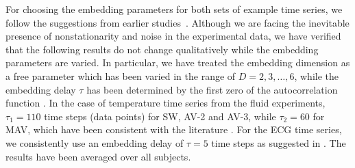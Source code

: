 \documentclass[aip,cha,reprint,nofootinbib]{revtex4-1}
\begin{document}
For choosing the embedding parameters for both sets of example time series, we follow the suggestions from earlier studies~\cite{ZouEPJST2008,smallCSF2002}. Although we are facing the inevitable presence of nonstationarity and noise in the experimental data, we have verified that the following results do not change {\color{red}qualitatively} while the embedding parameters are varied. In particular, we have treated the embedding dimension as a free parameter which has been varied in the range of $D = 2, 3, \ldots, 6$, while the embedding delay $\tau$ has been {\color{red} determined by the first zero of the autocorrelation function \cite{Kantz97}. In the case of temperature time series from the fluid experiments, $\tau_{1} = 110$ time steps (data points) for SW, AV-2 and AV-3, while $\tau_{2} = 60$ for MAV,  which have been consistent with the literature \cite{Read_jfm_1992,thiel2004a}.} For the ECG time series, we consistently use an embedding delay of $\tau = 5$ time steps as suggested in \cite{smallCSF2002}. The results have been averaged over all subjects. 
\end{document}
